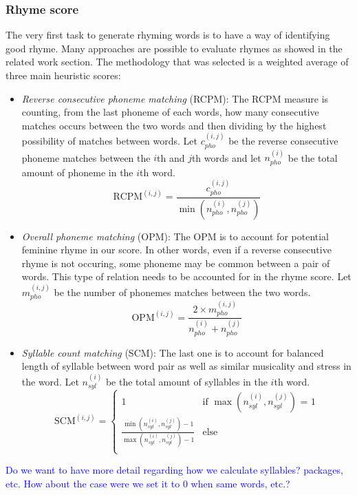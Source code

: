 \documentclass[11pt,a4paper]{article}
\begin{document}
\subsubsection{Rhyme score}
\label{sec:rhymescore}
The very first task to generate rhyming words is to have a way of identifying good rhyme. Many approaches are possible to evaluate rhymes as showed in the related work section. The methodology that was selected is a weighted average of three main heuristic scores:
\begin{itemize}
	\item \textit{Reverse consecutive phoneme matching} (RCPM):
	The RCPM measure is counting, from the last phoneme of each words, how many consecutive matches occurs between the two words and then dividing by the highest possibility of matches between words. Let $c^{(i,j)}_{pho}$ be the reverse consecutive phoneme matches between the $i$th and $j$th words and let $n^{(i)}_{pho}$ be the total amount of phoneme in the $i$th word.
	$$\textrm{RCPM}^{(i,j)} = \frac{c^{(i,j)}_{pho}}{\min(n^{(i)}_{pho}, n^{(j)}_{pho})}$$
	\item \textit{Overall phoneme matching} (OPM):
	The OPM is to account for potential feminine rhyme in our score. In other words, even if a reverse consecutive rhyme is not occuring, some phoneme may be common between a pair of words. This type of relation needs to be accounted for in the rhyme score. Let $m^{(i,j)}_{pho}$ be the number of phonemes matches between the two words.
	$$\textrm{OPM}^{(i,j)} = \frac{2 \times m^{(i,j)}_{pho}}{n^{(i)}_{pho} + n^{(j)}_{pho}}$$
	\item \textit{Syllable count matching} (SCM):
	The last one is to account for balanced length of syllable between word pair as well as similar musicality and stress in the word. Let $n^{(i)}_{syl}$ be the total amount of syllables in the $i$th word.
	\begin{equation}
  	\textrm{SCM}^{(i,j)} = 
    	\begin{cases}
      		1 & \text{if $\max(n^{(i)}_{syl}, n^{(j)}_{syl})$ = 1}\\
		\frac{\min(n^{(i)}_{syl}, n^{(j)}_{syl}) - 1}{\max(n^{(i)}_{syl}, n^{(j)}_{syl}) - 1} & \text{else}\\
    	\end{cases}       
	\end{equation}
\end{itemize}

\textcolor{blue}{
Do we want to have more detail regarding how we calculate syllables? packages, etc. How about the case were we set it to 0 when same words, etc.?
}
\end{document}
